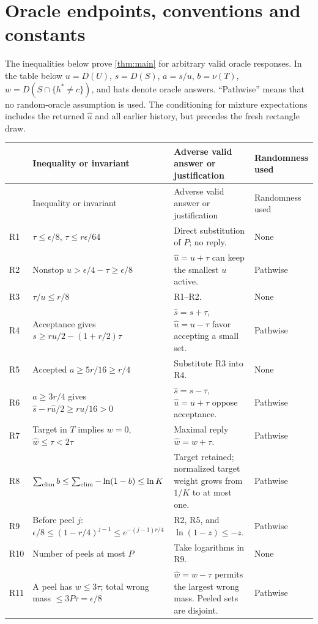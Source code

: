 \section{Oracle endpoints, conventions and constants}\label{app:oracle}
The inequalities below prove \cref{thm:main} for arbitrary valid oracle responses. In the table below $u=D(U)$, $s=D(S)$, $a=s/u$, $b=\nu(T)$, $w=D(S\cap\{h^*\ne c\})$, and hats denote oracle answers. ``Pathwise'' means that no random-oracle assumption is used. The conditioning for mixture expectations includes the returned $\widehat u$ and all earlier history, but precedes the fresh rectangle draw.

\small
\begin{longtable}{@{}p{.6cm}p{6.2cm}p{4.9cm}>{\raggedright\arraybackslash}p{2.4cm}@{}}
\toprule
& Inequality or invariant & Adverse valid answer or justification & Randomness used\\
\midrule\endfirsthead
\toprule & Inequality or invariant & Adverse valid answer or justification & Randomness used\\\midrule\endhead
R1 & $\tau\le\epsilon/8$, $\tau\le r\epsilon/64$ & Direct substitution of $P$; no reply. & None\\
R2 & Nonstop $u>\epsilon/4-\tau\ge\epsilon/8$ & $\widehat u=u+\tau$ can keep the smallest $u$ active. & Pathwise\\
R3 & $\tau/u\le r/8$ & R1--R2. & None\\
R4 & Acceptance gives $s\ge ru/2-(1+r/2)\tau$ & $\widehat s=s+\tau$, $\widehat u=u-\tau$ favor accepting a small set. & Pathwise\\
R5 & Accepted $a\ge5r/16\ge r/4$ & Substitute R3 into R4. & None\\
R6 & $a\ge3r/4$ gives $\widehat s-r\widehat u/2\ge ru/16>0$ & $\widehat s=s-\tau$, $\widehat u=u+\tau$ oppose acceptance. & Pathwise\\
R7 & Target in $T$ implies $w=0$, $\widehat w\le\tau<2\tau$ & Maximal reply $\widehat w=w+\tau$. & Pathwise\\
R8 & $\sum_{\rm elim}b\le\sum_{\rm elim}-\ln(1-b)\le\ln K$ & Target retained; normalized target weight grows from $1/K$ to at most one. & Pathwise\\
R9 & Before peel $j$: $\epsilon/8\le(1-r/4)^{j-1}\le e^{-(j-1)r/4}$ & R2, R5, and $\ln(1-z)\le-z$. & Pathwise\\
R10 & Number of peels at most $P$ & Take logarithms in R9. & None\\
R11 & A peel has $w\le3\tau$; total wrong mass $\le3P\tau=\epsilon/8$ & $\widehat w=w-\tau$ permits the largest wrong mass. Peeled sets are disjoint. & Pathwise\\

\end{longtable}
